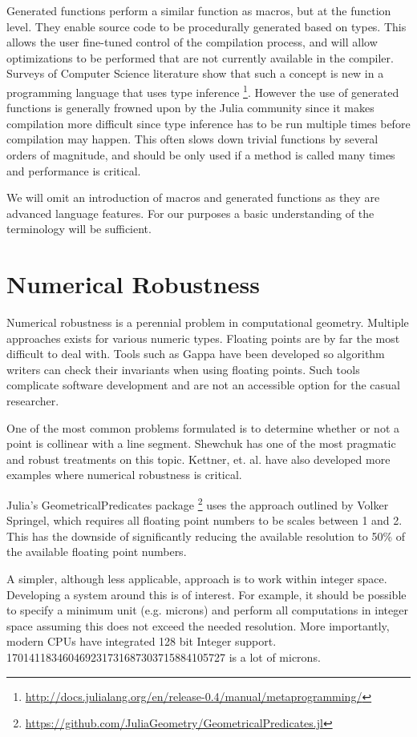 Generated functions perform a similar function as macros, but at the function
level. They enable source code to be procedurally generated based on types.
This allows the user fine-tuned control of the compilation process, and
will allow optimizations to be performed that are not currently
available in the compiler.
Surveys of Computer Science literature show that such a concept is new in
a programming language that uses type inference
\footnote{\url{http://docs.julialang.org/en/release-0.4/manual/metaprogramming/}}.
However the use of generated functions is generally frowned upon by the
Julia community since it makes compilation more difficult since type inference
has to be run multiple times before compilation may happen.
This often slows down trivial functions by
several orders of magnitude, and should be only used if a method is called
many times and performance is critical.

We will omit an introduction of macros and generated functions
as they are advanced language
features. For our purposes a basic understanding of the terminology will
be sufficient.


\section{Numerical Robustness}

Numerical robustness is a perennial problem in computational geometry\cite{Shamos_1999}.
Multiple
approaches exists for various numeric types. Floating points are by far
the most difficult to deal with. Tools such as Gappa have been developed so
algorithm writers can check their invariants when using floating points\cite{Gappa}.
Such tools complicate software development and are not an accessible option
for the casual researcher.

One of the most common problems formulated is to determine whether or not a
point is collinear with a line segment. Shewchuk has one of the most pragmatic
and robust treatments on this topic\cite{Shewchuk}. Kettner, et. al. have also
developed more examples where numerical robustness is critical\cite{Kettner_Mehlhorn_Pion_Schirra_Yap_2008}.

Julia's GeometricalPredicates package \footnote{\url{https://github.com/JuliaGeometry/GeometricalPredicates.jl}}
uses the approach outlined by Volker Springel, which requires all floating point
numbers to be scales between 1 and 2\cite{Springel_2010}. This has the downside
of significantly reducing the available resolution to 50\% of the available
floating point numbers.

A simpler, although less applicable, approach is to work
within integer space. Developing a system around this is of interest. For
example, it should be possible to specify a minimum unit (e.g. microns)
and perform all computations in integer space assuming this does not exceed
the needed resolution. More importantly, modern CPUs have integrated 128 bit
Integer support. 170141183460469231731687303715884105727 is a lot of microns.



